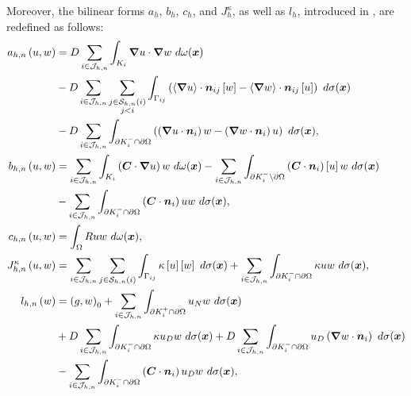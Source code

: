 Moreover, the bilinear forms $a_h$, $b_h$, $c_h$, and $J^{\kappa}_h$, as well as $l_h$, introduced in , are redefined as follows:
\begin{align}
    a_{h, n} \left( u, w \right) &= D \sum_{i \in \mathcal{J}_{h, n}} \int_{K_i} \bm{\nabla} u \cdot \bm{\nabla} w ~ d \omega(\bm{x}) \label{equation:cdr_ahn} \\
    &- D \sum_{i \in \mathcal{J}_{h, n}} \sum_{\substack{j \in \mathcal{S}_{h, n}(i) \\ j < i}} \int_{\Gamma_{ij}} \left( \left\langle \bm{\nabla} u \right\rangle \cdot \bm{n}_{ij} \left[ w \right] - \left\langle \bm{\nabla} w \right\rangle \cdot \bm{n}_{ij} \left[ u \right] \right) ~ d \sigma(\bm{x}) \notag \\
    &- D \sum_{i \in \mathcal{J}_{h, n}} \int_{\partial K_i^- \cap \partial \Omega} \left( \left( \bm{\nabla} u \cdot \bm{n}_i \right) w - \left( \bm{\nabla} w \cdot \bm{n}_i \right) u \right) ~ d \sigma(\bm{x}), \notag \\
    b_{h, n} \left( u, w \right) &= \sum_{i \in \mathcal{J}_{h, n}} \int_{K_i} \left( \bm{C} \cdot \bm{\nabla} u \right) w ~ d \omega(\bm{x}) \label{equation:cdr_bhn} - \sum_{i \in \mathcal{J}_{h, n}} \int_{\partial K_i^- \setminus \partial \Omega} \left( \bm{C} \cdot \bm{n}_i \right) \left[ u \right] w ~ d \sigma(\bm{x}) \\
    &- \sum_{i \in \mathcal{J}_{h, n}} \int_{\partial K_i^- \cap \partial \Omega} \left( \bm{C} \cdot \bm{n}_i \right) u w ~ d \sigma(\bm{x}), \notag \\
    c_{h, n} \left( u, w \right) &= \int_{\Omega} R u w ~ d \omega(\bm{x}), \label{equation:cdr_chn} \\
    J^{\kappa}_{h, n} \left( u, w \right) &= \sum_{i \in \mathcal{J}_{h, n}} \sum_{j \in \mathcal{S}_{h, n}(i)} \int_{\Gamma_{ij}} \kappa \left[ u \right] \left[ w \right] ~ d \sigma(\bm{x}) + \sum_{i \in \mathcal{J}_{h, n}} \int_{\partial K_i^- \cap \partial \Omega} \kappa u w ~ d \sigma(\bm{x}), \label{equation:cdr_jhn} \\
    l_{h, n} \left( w \right)  &= \left( g, w \right)_0 + \sum_{i \in \mathcal{J}_{h, n}} \int_{\partial K_i^+ \cap \partial \Omega} u_N w ~ d \sigma(\bm{x}) \label{equation:cdr_lhn} \\
    &+ D \sum_{i \in \mathcal{J}_{h, n}} \int_{\partial K_i^- \cap \partial \Omega} \kappa u_D w ~ d \sigma(\bm{x}) + D \sum_{i \in \mathcal{J}_{h, n}} \int_{\partial K_i^- \cap \partial \Omega} u_D \left( \bm{\nabla} w \cdot \bm{n}_i \right) ~ d \sigma(\bm{x}) \notag \\
    &- \sum_{i \in \mathcal{J}_{h, n}} \int_{\partial K_i^- \cap \partial \Omega} \left( \bm{C} \cdot \bm{n}_i \right) u_D w ~ d \sigma(\bm{x}) \notag,
\end{align}

